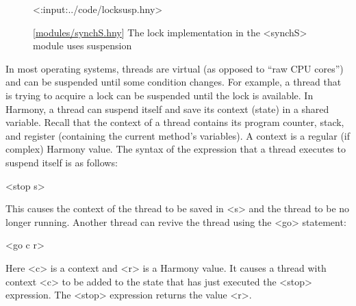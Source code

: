 \documentclass{report}
\newcommand{\harmonylink}[1]{%
[\href{https://harmony.cs.cornell.edu/#1}{\underline{#1}}]%
}
\newenvironment{code}{
\tcolorbox
}{
\endtcolorbox
}
\begin{document}
\begin{figure}
\begin{code}
<{:input:../code/locksusp.hny}>
\end{code}
\caption{\harmonylink{modules/synchS.hny} The lock implementation in the <{synchS}> module uses suspension}
\label{fig:suspension}
\end{figure}

In most operating systems, threads are virtual (as opposed to ``raw CPU cores'')
and can be suspended until some condition changes.
For example, a thread that is trying to acquire a lock can be suspended until the lock is
available.
In Harmony, a thread can suspend itself and save its context (state) in a
shared variable.  Recall that the context of a thread contains
its program counter, stack, and register (containing the current
method's variables).
A context is a regular (if complex) Harmony value.
The syntax of the expression that a thread executes to suspend itself
is as follows:

\begin{code}
<{stop s}>
\end{code}

This causes the context of the thread to be saved in <{s}> and
the thread to be no longer running.
Another thread can revive the thread using the <{go}>
%
statement:

\begin{code}
<{go c r}>
\end{code}

Here <{c}> is a context and <{r}> is a Harmony value.
It causes a thread with context <{c}> to be added to the state that has
just executed the <{stop}>
%
expression.  The <{stop}> expression returns the value <{r}>.
\end{document}
